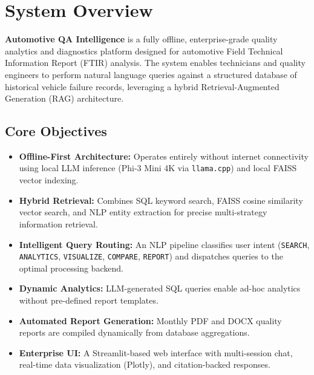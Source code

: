\documentclass[12pt, a4paper, twoside]{article}
\begin{document}
\newpage

\thispagestyle{fancy}
\tableofcontents
\newpage

\section{System Overview}

\textbf{Automotive QA Intelligence} is a fully offline, enterprise-grade quality analytics and diagnostics platform designed for automotive Field Technical Information Report (FTIR) analysis. The system enables technicians and quality engineers to perform natural language queries against a structured database of historical vehicle failure records, leveraging a hybrid Retrieval-Augmented Generation (RAG) architecture.

\subsection{Core Objectives}

\begin{itemize}[leftmargin=*, itemsep=4pt]
  \item \textbf{Offline-First Architecture:} Operates entirely without internet connectivity using local LLM inference (Phi-3 Mini 4K via \texttt{llama.cpp}) and local FAISS vector indexing.
  \item \textbf{Hybrid Retrieval:} Combines SQL keyword search, FAISS cosine similarity vector search, and NLP entity extraction for precise multi-strategy information retrieval.
  \item \textbf{Intelligent Query Routing:} An NLP pipeline classifies user intent (\texttt{SEARCH}, \texttt{ANALYTICS}, \texttt{VISUALIZE}, \texttt{COMPARE}, \texttt{REPORT}) and dispatches queries to the optimal processing backend.
  \item \textbf{Dynamic Analytics:} LLM-generated SQL queries enable ad-hoc analytics without pre-defined report templates.
  \item \textbf{Automated Report Generation:} Monthly PDF and DOCX quality reports are compiled dynamically from database aggregations.
  \item \textbf{Enterprise UI:} A Streamlit-based web interface with multi-session chat, real-time data visualization (Plotly), and citation-backed responses.
\end{itemize}
\end{document}
